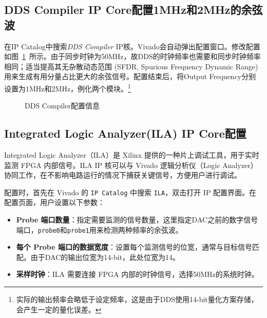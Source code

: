 \subsection{DDS Compiler IP Core配置1MHz和2MHz的余弦波}
在IP Catalog中搜索\textit{DDS Compiler} IP核。Vivado会自动弹出配置窗口。修改配置如图~\ref{fig:exp3:dds-1}~所示。由于同步时钟为50MHz，故DDS的时钟频率也需要和同步时钟频率相同；适当提高其无杂散动态范围 (SFDR, Spurious Frequency Dynamic Range)用来生成有用分量占比更大的余弦信号。配置结束后，将Output Frequency分别设置为1MHz和2MHz，例化两个模块。\footnote{实际的输出频率会略低于设定频率，这是由于DDS使用14-bit量化方案存储，会产生一定的量化误差。}
\begin{figure}[htbp]
  \centering
  \hfill
  \caption{DDS Compiler配置信息}
  \label{fig:exp3:dds-1}
\end{figure}

\subsection{Integrated Logic Analyzer(ILA) IP Core配置}

Integrated Logic Analyzer（ILA）是 Xilinx 提供的一种片上调试工具，用于实时监测 FPGA 内部信号。ILA IP 核可以与 Vivado 逻辑分析仪（Logic Analyzer）协同工作，在不影响电路运行的情况下捕获关键信号，方便用户进行调试。

配置时，首先在 Vivado 的 \texttt{IP Catalog} 中搜索 \texttt{ILA}，双击打开 IP 配置界面。在配置页面，用户设置以下参数：
\begin{itemize}
    \item \textbf{Probe 端口数量}：指定需要监测的信号数量，这里指定DAC之前的数字信号端口，\texttt{probe0}和\texttt{probe1}用来检测两种频率的余弦波。
    \item \textbf{每个 Probe 端口的数据宽度}：设置每个监测信号的位宽，通常与目标信号匹配。由于DAC的输出位宽为14-bit，此处位宽为14。
    \item \textbf{采样时钟}：ILA 需要连接 FPGA 内部的时钟信号，选择50MHz的系统时钟。
\end{itemize}

